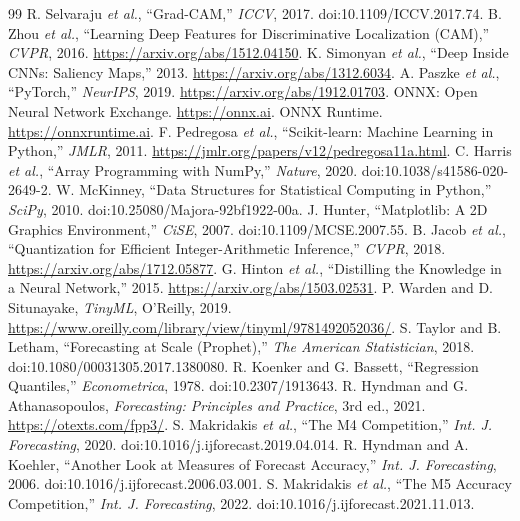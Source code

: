 \documentclass[12pt]{article}
\begin{document}
\begin{thebibliography}{99}
 R. Selvaraju \emph{et al.}, ``Grad-CAM,'' \emph{ICCV}, 2017. doi:10.1109/ICCV.2017.74.
 B. Zhou \emph{et al.}, ``Learning Deep Features for Discriminative Localization (CAM),'' \emph{CVPR}, 2016. \url{https://arxiv.org/abs/1512.04150}.
 K. Simonyan \emph{et al.}, ``Deep Inside CNNs: Saliency Maps,'' 2013. \url{https://arxiv.org/abs/1312.6034}.
 A. Paszke \emph{et al.}, ``PyTorch,'' \emph{NeurIPS}, 2019. \url{https://arxiv.org/abs/1912.01703}.
 ONNX: Open Neural Network Exchange. \url{https://onnx.ai}.
 ONNX Runtime. \url{https://onnxruntime.ai}.
 F. Pedregosa \emph{et al.}, ``Scikit-learn: Machine Learning in Python,'' \emph{JMLR}, 2011. \url{https://jmlr.org/papers/v12/pedregosa11a.html}.
 C. Harris \emph{et al.}, ``Array Programming with NumPy,'' \emph{Nature}, 2020. doi:10.1038/s41586-020-2649-2.
 W. McKinney, ``Data Structures for Statistical Computing in Python,'' \emph{SciPy}, 2010. doi:10.25080/Majora-92bf1922-00a.
 J. Hunter, ``Matplotlib: A 2D Graphics Environment,'' \emph{CiSE}, 2007. doi:10.1109/MCSE.2007.55.
 B. Jacob \emph{et al.}, ``Quantization for Efficient Integer-Arithmetic Inference,'' \emph{CVPR}, 2018. \url{https://arxiv.org/abs/1712.05877}.
 G. Hinton \emph{et al.}, ``Distilling the Knowledge in a Neural Network,'' 2015. \url{https://arxiv.org/abs/1503.02531}.
 P. Warden and D. Situnayake, \emph{TinyML}, O'Reilly, 2019. \url{https://www.oreilly.com/library/view/tinyml/9781492052036/}.
 S. Taylor and B. Letham, ``Forecasting at Scale (Prophet),'' \emph{The American Statistician}, 2018. doi:10.1080/00031305.2017.1380080.
 R. Koenker and G. Bassett, ``Regression Quantiles,'' \emph{Econometrica}, 1978. doi:10.2307/1913643.
 R. Hyndman and G. Athanasopoulos, \emph{Forecasting: Principles and Practice}, 3rd ed., 2021. \url{https://otexts.com/fpp3/}.
 S. Makridakis \emph{et al.}, ``The M4 Competition,'' \emph{Int. J. Forecasting}, 2020. doi:10.1016/j.ijforecast.2019.04.014.
 R. Hyndman and A. Koehler, ``Another Look at Measures of Forecast Accuracy,'' \emph{Int. J. Forecasting}, 2006. doi:10.1016/j.ijforecast.2006.03.001.
 S. Makridakis \emph{et al.}, ``The M5 Accuracy Competition,'' \emph{Int. J. Forecasting}, 2022. doi:10.1016/j.ijforecast.2021.11.013.

\end{thebibliography}
\end{document}
